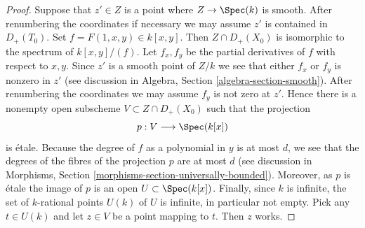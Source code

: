 \begin{proof}
Suppose that $z' \in Z$ is a point where $Z \to \Spec(k)$ is smooth.
After renumbering the coordinates if necessary we may assume
$z'$ is contained in $D_+(T_0)$. Set $f = F(1, x, y) \in k[x, y]$.
Then $Z \cap D_+(X_0)$ is isomorphic to the spectrum of $k[x, y]/(f)$.
Let $f_x, f_y$ be the partial derivatives of $f$ with respect to
$x, y$. Since $z'$ is a smooth point of $Z/k$ we see that either
$f_x$ or $f_y$ is nonzero in $z'$ (see discussion in
Algebra, Section \ref{algebra-section-smooth}).
After renumbering the coordinates
we may assume $f_y$ is not zero at $z'$. Hence there is a nonempty
open subscheme $V \subset Z \cap D_{+}(X_0)$ such that the
projection
$$
p : V \longrightarrow \Spec(k[x])
$$
is \'etale. Because the degree of $f$ as a polynomial in $y$
is at most $d$, we see that the degrees of the fibres of the
projection $p$ are at most $d$ (see discussion in
Morphisms, Section \ref{morphisms-section-universally-bounded}).
Moreover, as $p$ is \'etale
the image of $p$ is an open $U \subset \Spec(k[x])$.
Finally, since $k$ is infinite, the set of $k$-rational points
$U(k)$ of $U$ is infinite, in particular not empty. Pick any
$t \in U(k)$ and let $z \in V$ be a point mapping to $t$.
Then $z$ works.
\end{proof}





